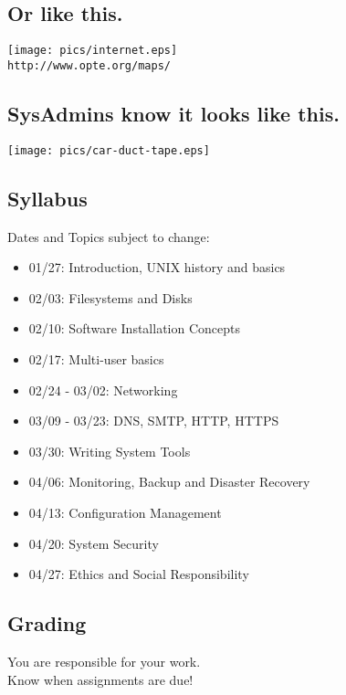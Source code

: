 \documentclass[xga]{xdvislides}
\begin{document}
\subsection{Or like this.}
\begin{center}
	\texttt{[image: pics/internet.eps]} \\
	\small
	{\tt http://www.opte.org/maps/}
	\Normalsize
\end{center}

\subsection{SysAdmins know it looks like this.}
\vspace*{\fill}
\begin{center}
    \texttt{[image: pics/car-duct-tape.eps]}
\end{center}
\vspace*{\fill}

\subsection{Syllabus}
Dates and Topics subject to change:
\begin{itemize}
	\item 01/27: Introduction, UNIX history and basics
	\item 02/03: Filesystems and Disks
	\item 02/10: Software Installation Concepts
	\item 02/17: Multi-user basics
	\item 02/24 - 03/02: Networking
	\item 03/09 - 03/23: DNS, SMTP, HTTP, HTTPS
	\item 03/30: Writing System Tools
	\item 04/06: Monitoring, Backup and Disaster Recovery
	\item 04/13: Configuration Management
	\item 04/20: System Security
	\item 04/27: Ethics and Social Responsibility
\end{itemize}

\subsection{Grading}
You are responsible for your work. \\
Know when assignments are due! \\
\end{document}
